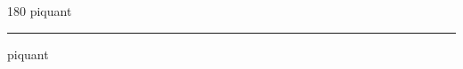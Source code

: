 
\begin{frame}
\begin{center}
\begin{turn}{180}
{\fontsize{2.5cm}{1em}\selectfont piquant}
\end{turn}
\vspace{1em}\par  
\hrule
\vspace{1em}\par  
{\fontsize{2.5cm}{1em}\selectfont piquant}
\end{center}
\end{frame}
